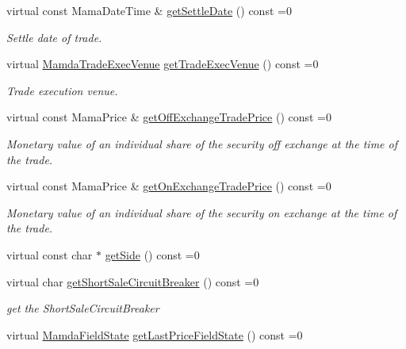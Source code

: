 \begin{CompactItemize}
virtual const Mama\-Date\-Time \& \hyperlink{classWombat_1_1MamdaTradeRecap_80a2aabb513c40dc4d7d22173077b5db}{get\-Settle\-Date} () const =0
\begin{CompactList}\small\item\em Settle date of trade. \item\end{CompactList}\item 
virtual \hyperlink{namespaceWombat_daf4c098665070a9e45bf835bad3548a}{Mamda\-Trade\-Exec\-Venue} \hyperlink{classWombat_1_1MamdaTradeRecap_6df7435306c01b0d0828d9a524fbe0bd}{get\-Trade\-Exec\-Venue} () const =0
\begin{CompactList}\small\item\em Trade execution venue. \item\end{CompactList}\item 
virtual const Mama\-Price \& \hyperlink{classWombat_1_1MamdaTradeRecap_4441eab85326326aa600c783a33a55bd}{get\-Off\-Exchange\-Trade\-Price} () const =0
\begin{CompactList}\small\item\em Monetary value of an individual share of the security off exchange at the time of the trade. \item\end{CompactList}\item 
virtual const Mama\-Price \& \hyperlink{classWombat_1_1MamdaTradeRecap_9979bc1d67b53dca01261a34a06d0834}{get\-On\-Exchange\-Trade\-Price} () const =0
\begin{CompactList}\small\item\em Monetary value of an individual share of the security on exchange at the time of the trade. \item\end{CompactList}\item 
virtual const char $\ast$ \hyperlink{classWombat_1_1MamdaTradeRecap_43b14f3da3e3df82401ac524cb33f6a5}{get\-Side} () const =0
\item 
virtual char \hyperlink{classWombat_1_1MamdaTradeRecap_8fffec973ff9978944e72d9438c6a1cd}{get\-Short\-Sale\-Circuit\-Breaker} () const =0
\begin{CompactList}\small\item\em get the Short\-Sale\-Circuit\-Breaker \item\end{CompactList}\item 
virtual \hyperlink{namespaceWombat_93aac974f2ab713554fd12a1fa3b7d2a}{Mamda\-Field\-State} \hyperlink{classWombat_1_1MamdaTradeRecap_f4508406463e09aab15652b4b30b0bbc}{get\-Last\-Price\-Field\-State} () const =0

\end{CompactItemize}

